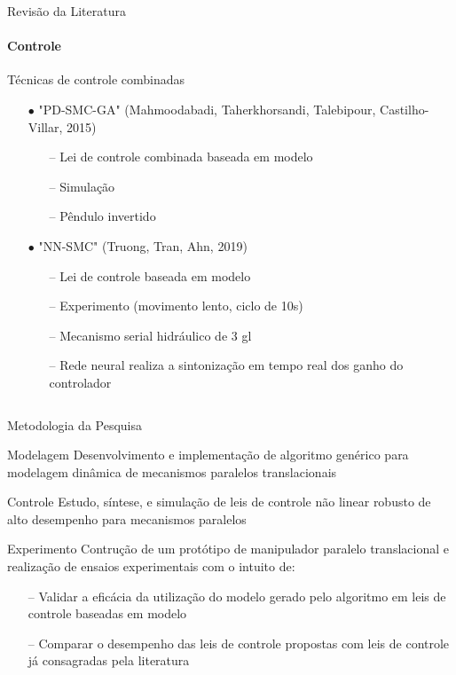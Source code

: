\documentclass[25pt,landscape]{beamer}
\begin{document}
\begin{frame}{Revisão da Literatura}
    \framesubtitle{Controle}
    \begin{block}{Técnicas de controle combinadas}
        \begin{itemize}
            \item[$\bullet$] "PD-SMC-GA" (Mahmoodabadi, Taherkhorsandi, Talebipour, Castilho-Villar, 2015)
            \begin{itemize}
            	\item[--] Lei de controle combinada baseada em modelo
            	\item[--] Simulação
            	\item[--] Pêndulo invertido
            \end{itemize}
        \item[$\bullet$] "NN-SMC" (Truong, Tran, Ahn, 2019)
            \begin{itemize}
            	\item[--] Lei de controle baseada em modelo
            	\item[--] Experimento (movimento lento, ciclo de 10s)
            	\item[--] Mecanismo serial hidráulico de 3 gl
            	\item[--] Rede neural realiza a sintonização em tempo real dos ganho do controlador
            \end{itemize}
        \end{itemize}
    \end{block}
    $$ $$
    $$ $$
\end{frame}

\begin{frame}{Metodologia da Pesquisa}
	\pause
    \begin{block}{Modelagem}
        Desenvolvimento e implementação de algoritmo genérico para modelagem dinâmica de mecanismos paralelos translacionais
    \end{block}
    \pause
    \begin{block}{Controle}
        Estudo, síntese, e simulação de leis de controle não linear robusto de alto desempenho para mecanismos paralelos 
    \end{block}
    \pause
    \begin{block}{Experimento}
		Contrução de um protótipo de manipulador paralelo translacional e realização de ensaios experimentais com o intuito de:
		\begin{itemize}
			\item[--] Validar a eficácia da utilização do modelo gerado pelo algoritmo em leis de controle baseadas em modelo
			\item[--] Comparar o desempenho das leis de controle propostas com leis de controle já consagradas pela literatura
		\end{itemize}
    \end{block}
\end{frame}
\end{document}
